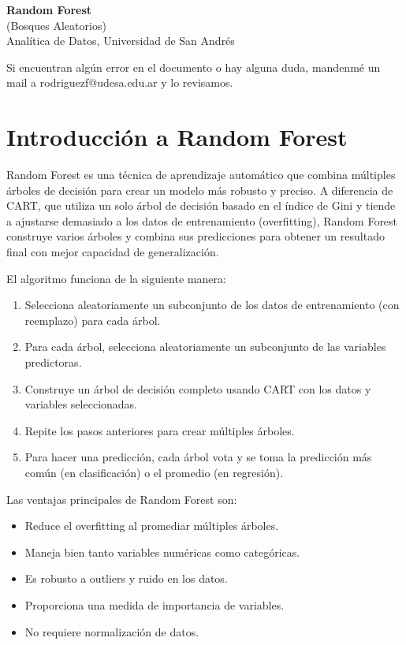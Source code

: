 \documentclass[12pt]{article}
\begin{document}
\begin{center}
  {\LARGE \textbf{Random Forest}}\\[0.5em]
  {\normalsize (Bosques Aleatorios)}\\[0.5em]
  {Analítica de Datos, Universidad de San Andrés}
\end{center}

Si encuentran algún error en el documento o hay alguna duda, mandenmé un mail a rodriguezf@udesa.edu.ar y lo revisamos.

\section{Introducción a Random Forest}
Random Forest es una técnica de aprendizaje automático que combina múltiples árboles de decisión para crear un modelo más robusto y preciso. A diferencia de CART, que utiliza un solo árbol de decisión basado en el índice de Gini y tiende a ajustarse demasiado a los datos de entrenamiento (overfitting), Random Forest construye varios árboles y combina sus predicciones para obtener un resultado final con mejor capacidad de generalización.

\vspace{1em}

El algoritmo funciona de la siguiente manera:
\begin{enumerate}
    \item Selecciona aleatoriamente un subconjunto de los datos de entrenamiento (con reemplazo) para cada árbol.
    \item Para cada árbol, selecciona aleatoriamente un subconjunto de las variables predictoras.
    \item Construye un árbol de decisión completo usando CART con los datos y variables seleccionadas.
    \item Repite los pasos anteriores para crear múltiples árboles.
    \item Para hacer una predicción, cada árbol vota y se toma la predicción más común (en clasificación) o el promedio (en regresión).
\end{enumerate}

\vspace{1em}

Las ventajas principales de Random Forest son:
\begin{itemize}
    \item Reduce el overfitting al promediar múltiples árboles.
    \item Maneja bien tanto variables numéricas como categóricas.
    \item Es robusto a outliers y ruido en los datos.
    \item Proporciona una medida de importancia de variables.
    \item No requiere normalización de datos.
\end{itemize}
\end{document}
